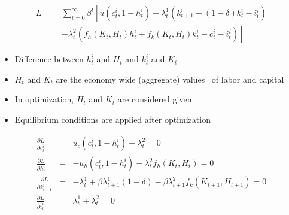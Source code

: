 \documentclass[notes=show]{beamer}
\begin{document}
\begin{frame}%


\begin{eqnarray*}
L &=&\sum_{t=0}^{\infty }\beta ^{t}\left[ u\left(
c_{t}^{i},1-h_{t}^{i}\right) -\lambda _{t}^{1}\left( k_{t+1}^{i}-\left(
1-\delta \right) k_{t}^{i}-i_{t}^{i}\right) \right. \\
&&\left. -\lambda _{t}^{2}\left( f_{h}\left( K_{t},H_{t}\right)
h_{t}^{i}+f_{k}\left( K_{t},H_{t}\right)
k_{t}^{i}-c_{t}^{i}-i_{t}^{i}\right) \right]
\end{eqnarray*}

\begin{itemize}
\item Difference between $h_{t}^{i}$ and $H_{t}$ and $k_{t}^{i}$ and $K_{t}$

\item $H_{t}$ and $K_{t}$ are the economy wide (aggregate) values \ of labor
and capital

\item In optimization, $H_{t}$ and $K_{t}$ are considered given

\item Equilibrium conditions are applied after optimization
\end{itemize}

\end{frame}%

\begin{frame}%


\begin{eqnarray*}
\frac{\partial L}{\partial c_{t}^{i}} &=&u_{c}\left(
c_{t}^{i},1-h_{t}^{i}\right) +\lambda _{t}^{2}=0 \\
\frac{\partial L}{\partial h_{t}^{i}} &=&-u_{h}\left(
c_{t}^{i},1-h_{t}^{i}\right) -\lambda _{t}^{2}f_{h}\left( K_{t},H_{t}\right)
=0 \\
\frac{\partial L}{\partial k_{t+1}^{i}} &=&-\lambda _{t}^{1}+\beta \lambda
_{t+1}^{1}\left( 1-\delta \right) -\beta \lambda _{t+1}^{2}f_{k}\left(
K_{t+1},H_{t+1}\right) =0 \\
\frac{\partial L}{\partial i_{t}^{i}} &=&\lambda _{t}^{1}+\lambda _{t}^{2}=0
\end{eqnarray*}

\end{frame}%
\end{document}
